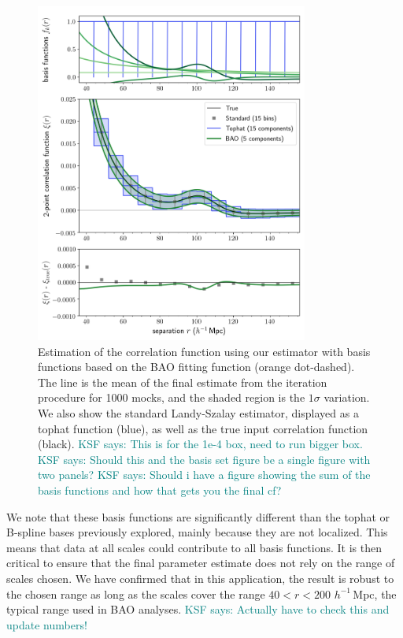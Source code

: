 \documentclass[modern]{aastex62}
\newcommand{\hmpc}{$h^{-1}\,$Mpc}
\newcommand{\KSF}[1]{\textcolor{teal}{KSF says: #1}}
\begin{document}
\label{fig:bao}
\begin{figure}[th]
\centering
    \includegraphics[width=0.8\textwidth]{xicomparison_2e-4_tophat8_baoiter}
    \caption{Estimation of the correlation function using our estimator with basis functions based on the BAO fitting function (orange dot-dashed). The line is the mean of the final estimate from the iteration procedure for 1000 mocks, and the shaded region is the $1\sigma$ variation. We also show the standard Landy-Szalay estimator, displayed as a tophat function (blue), as well as the true input correlation function (black). \KSF{This is for the 1e-4 box, need to run bigger box.} \KSF{Should this and the basis set figure be a single figure with two panels?} \KSF{Should i have a figure showing the sum of the basis functions and how that gets you the final cf?}}
\end{figure}

We note that these basis functions are significantly different than the tophat or B-spline bases previously explored, mainly because they are not localized.
This means that data at all scales could contribute to all basis functions.
It is then critical to ensure that the final parameter estimate does not rely on the range of scales chosen.
We have confirmed that in this application, the result is robust to the chosen range as long as the scales cover the range $40<r<200$ \hmpc, the typical range used in BAO analyses. \KSF{Actually have to check this and update numbers!}
\end{document}

